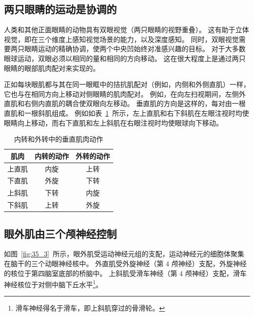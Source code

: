 \subsection{两只眼睛的运动是协调的}

人类和其他正面眼睛的动物具有双眼视觉（两只眼睛的视野重叠）。
这有助于立体视觉，即在三个维度上感知视觉场景的能力，以及深度感知。
同时，双眼视觉需要两只眼睛运动的精确协调，使两个中央凹始终对准感兴趣的目标。
对于大多数眼球运动，双眼必须以相同的量和相同的方向移动。 
这在很大程度上是通过两只眼睛的眼部肌肉配对来实现的。


正如每块眼肌都与其在同一眼眶中的拮抗肌配对（例如，内侧和外侧直肌）一样，它也与在相同方向上移动对侧眼睛的肌肉配对。
例如，在向左扫视期间，左侧外直肌和右侧内直肌的耦合使双眼向左移动。
垂直肌的方向是这样的，每对由一根直肌和一根斜肌组成。
例如如表~\ref{tab:35_1}~所示，左上直肌和右下斜肌在左眼注视时均使眼睛向上移动，而右下直肌和左上斜肌在右眼注视时均使眼球向下移动。


\begin{table}[htbp]
	\caption{内转和外转中的垂直肌肉动作\label{tab:35_1}}
	\centering
	\begin{tabular}{ccc}
		\toprule
		肌肉 & 内转的动作 
		& 外转的动作 \\
		\midrule
		上直肌 & 内旋  & 上转 \\
		下直肌      & 外旋 	& 下转 \\
		上斜肌      & 下转 	& 内旋 \\
		下斜肌      & 上转 	& 外旋 \\
		\bottomrule
	\end{tabular}
\end{table}



\subsection{眼外肌由三个颅神经控制}

如图~\ref{fig:35_3}~所示，眼外肌受运动神经元组的支配，运动神经元的细胞体聚集在脑干的三个动眼神经核中。
外直肌受外旋神经（第 4 颅神经）支配，外旋神经的核位于第四脑室底部的桥脑中。
上斜肌受滑车神经（第 4 颅神经）支配，滑车神经核位于对侧中脑下丘水平\footnote{滑车神经得名于滑车，即上斜肌穿过的骨滑轮。}。


